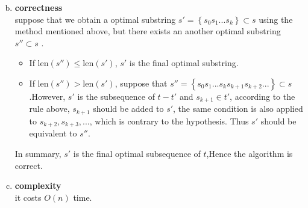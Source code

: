 \begin{enumerate}[a).]
\[	\]
	\item \textbf{correctness} \\
	suppose that we obtain a optimal substring $s' = \left\lbrace s_0s_1...s_{k}\right\rbrace \subset s$ 
	using the method mentioned above,
	but there exists an another optimal substring $s''  \subset s$ .
	\begin{itemize}
		\item If $\text{len}(s'') \leq \text{len}(s')$, $s'$ is the final optimal substring.
		\item If $\text{len}(s'') > \text{len}(s')$, suppose that $s'' = \left\lbrace s_0s_1...s_{k}s_{k+1}s_{k+2}...\right\rbrace \subset s$.However, $s'$ is the subsequence of $t - t'$ and $s_{k+1}\in t'$, according to the rule above,
		$s_{k+1}$ should be added to $s'$, the same condition is also applied to $s_{k+2},s_{k+3},...$,
		which is contrary to the hypothesis.
		Thus $s'$ should be equivalent to $s''$.
	\end{itemize}
	In summary, $s'$ is the final optimal subsequence of $t$,Hence the algorithm is correct.
	\item \textbf{complexity} \\
	it costs $O(n)$ time.	
	
\end{enumerate}	
